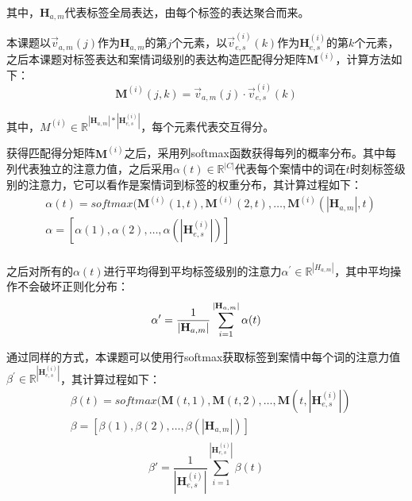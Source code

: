 其中，$\textbf{H}_{a,m}$代表标签全局表达，由每个标签的表达聚合而来。

本课题以$\vec{v}_{a,m}(j)$作为$\textbf{H}_{a,m}$的第$j$个元素，以$\vec{v}_{e,s}^{(i)}(k)$作为$\textbf{H}_{e,s}^{(i)}$的第$k$个元素，之后本课题对标签表达和案情词级别的表达构造匹配得分矩阵$\textbf{M}^{(i)}$，计算方法如下：
\begin{equation}\label{eq:match score}
    \textbf{M}^{(i)}(j,k) = \vec{v}_{a,m}(j) \cdot \vec{v}_{e,s}^{(i)}(k)
\end{equation}

其中，$M^{(i)} \in \mathbb{R}^{|\textbf{H}_{a,m}|*|\textbf{H}_{e,s}^{(i)}|}$，每个元素代表交互得分。

获得匹配得分矩阵$\textbf{M}^{(i)}$之后，采用列softmax函数获得每列的概率分布。其中每列代表独立的注意力值，之后采用$\alpha(t) \in \mathbb{R}^{|C|}$代表每个案情中的词在$t$时刻标签级别的注意力，它可以看作是案情词到标签的权重分布，其计算过程如下：
\begin{equation}\label{eq:alpha attention}
    \begin{aligned}
        & \alpha(t)=softmax(\textbf{M}^{(i)}(1,t), \textbf{M}^{(i)}(2,t), \dots, \textbf{M}^{(i)}(|\textbf{H}_{a,m}|,t)\\
        & \alpha=[\alpha(1),\alpha(2),\dots,\alpha(|\textbf{H}_{e,s}^{(i)}|)] \\
    \end{aligned}
\end{equation}

之后对所有的$\alpha(t)$进行平均得到平均标签级别的注意力$\alpha^{'} \in \mathbb{R}^{|H_{a,m}|}$，其中平均操作不会破坏正则化分布：
\begin{equation}\label{eq:avg alpha}
    \alpha{'}=\frac{1}{|\textbf{H}_{a,m}|}\sum\limits_{i=1}^{|\textbf{H}_{a,m}|}\alpha(t) \\
\end{equation}

通过同样的方式，本课题可以使用行softmax获取标签到案情中每个词的注意力值$\beta^{'} \in \mathbb{R}^{|\textbf{H}_{e,s}^{(i)}|}$，其计算过程如下：
\begin{equation}
    \begin{aligned}
        & \beta(t)=softmax(\textbf{M}(t,1), \textbf{M}(t,2), \dots, \textbf{M}(t, |\textbf{H}_{e,s}^{(i)}|)\\
        & \beta = [\beta(1), \beta(2), \dots, \beta(|\textbf{H}_{a,m}|)] \\
    \end{aligned}
\end{equation}
\begin{equation}
    \beta{'}=\frac{1}{|\textbf{H}_{e,s}^{(i)}|}\sum\limits_{i=1}^{|\textbf{H}_{e,s}^{(i)}|}\beta(t)
\end{equation}


